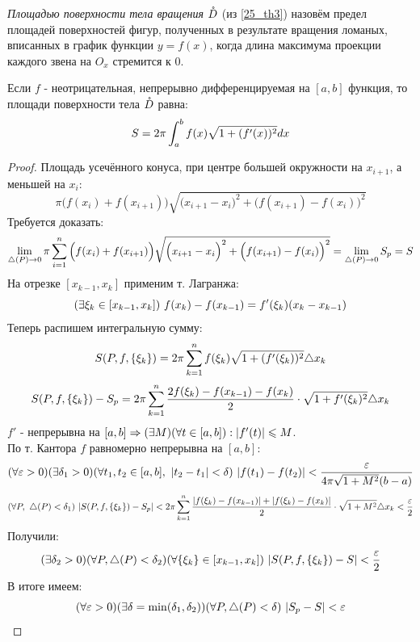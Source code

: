 \begin{definition}
	\textit{Площадью поверхности тела вращения} $\mathring D$ (из \ref{25_th3}) назовём предел площадей поверхностей фигур, полученных в результате вращения ломаных, вписанных в график функции $y=f(x)$, когда длина максимума проекции каждого звена на $O_x$ стремится к 0.
\end{definition}
\begin{theorem}
	Если $f$ - неотрицательная, непрерывно дифференцируемая на $[a,b]$ функция, то площади поверхности тела $\mathring D$  равна: \[S=\displaystyle2\pi\int_a^bf(x)\sqrt{1+(f'(x))^2}dx\]
\end{theorem}
\begin{proof}
	Площадь усечённого конуса, при центре большей окружности на $x_{i+1}$, а меньшей на $x_i$:
	\[\pi\Big(f(x_i)+f(x_{i+1})\Big)\sqrt{\Big(x_{i+1}-x_i\Big)^2+\Big(f(x_{i+1})-f(x_i)\Big)^2}\]
	Требуется доказать:
	\[\lim_{\tr(P)\ra0}\pi\sum_{i=1}^n\Big(f(x_i)+f(x_{i+1})\Big)\sqrt{\Big(x_{i+1}-x_i\Big)^2+\Big(f(x_{i+1})-f(x_i)\Big)^2}=\lim_{\tr(P)\ra0}S_p=S\]
	На отрезке $[x_{k-1},x_k]$ применим т. Лагранжа:
	\[(\ex \xi_k\in[x_{k-1},x_k])\ f(x_k)-f(x_{k-1})=f'(\xi_k)(x_k-x_{k-1})\]
	Теперь распишем интегральную сумму:
	\[S(P,f,\{\xi_k\})=2\pi\sum_{k=1}^nf(\xi_k)\sqrt{1+(f'(\xi_k))^2}\tr x_k\]
	\[S(P,f,\{\xi_k\})-S_p=2\pi\sum_{k=1}^n\frac{2f(\xi_k)-f(x_{k-1})-f(x_k)}2\cdot\sqrt{1+f'(\xi_k)^2}\tr x_k\]
	$f'$ - непрерывна на $[a,b]\Rightarrow(\exists M)(\forall t\in[a,b]):|f'(t)|\leqslant M$.\\
	По т. Кантора $f$ равномерно непрерывна на $[a,b]$:
	\[(\fa\eps>0)(\ex\delta_1>0)(\fa t_1,t_2\in[a,b],\ |t_2-t_1|<\delta)\ |f(t_1)-f(t_2)|<\frac\eps{4\pi\sqrt{1+M^2}(b-a)}\]
	\[(\fa P,\ \tr(P)<\delta_1)\ |S(P,f,\{\xi_k\})-S_p|<2\pi\sum_{k=1}^n\frac{|f(\xi_k)-f(x_{k-1})|+|f(\xi_k)-f(x_k)|}2\cdot\sqrt{1+M^2}\tr x_k<\frac\eps2\]
	Получили:
	\[(\ex\delta_2>0)(\fa P,\tr(P)<\delta_2)(\fa\{\xi_k\}\in[x_{k-1},x_k])\ |S(P,f,\{\xi_k\})-S|<\frac\eps2\]
	В итоге имеем:
	\[(\forall\varepsilon>0)(\exists\delta=\min(\delta_1,\delta_2))(\forall P,\triangle(P)<\delta)\ |S_p-S|<\varepsilon\]
\end{proof}
